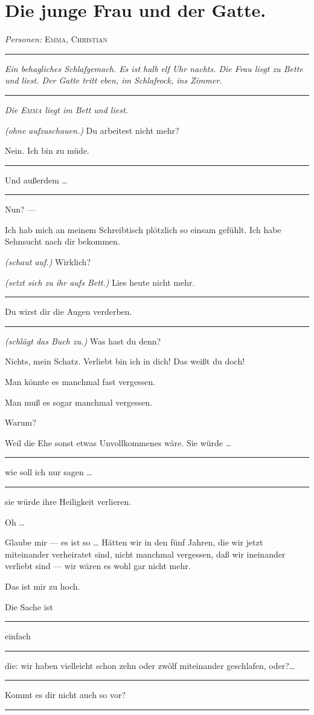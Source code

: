 \documentclass[
	final,
	a4paper,
	ngerman,
	mpinclude = true, %
	twoside = true,
	open = right,
	cleardoublepage = plain,
	DIV = 13,
	BCOR = 1cm,
	titlepage = firstiscover,
	]{scrbook}
\newcommand{\scene}{\section}
\newcommand{\direction}[1]{\textit{(#1)}}
\newcommand{\setting}[1]{\vspace{-0.5\baselineskip}\centering\textit{#1}}
\newenvironment{deletion}{%
		\vspace{0.25\baselineskip}
		\hrule
		\vspace{0.25\baselineskip}
		\color{darkgray}
	}{
		\color{black}
		\vspace{0.25\baselineskip}
		\hrule 
		\vspace{0.25\baselineskip}
	}
\newcommand{\characterlist}[1]{{\begin{center}\textit{Personen:} #1\end{center}}}
\newcommand{\thecharacter}[1]{\textup{\textsc{#1}}\xspace}
\newcommand{\thefrau}{\thecharacter{Emma}}
\newcommand{\thegatte}{\thecharacter{Christian}}
\newcommand{\character}[1]{\item[#1:]}
\newcommand{\frau}{\character{\thefrau}}
\newcommand{\gatte}{\character{\thegatte}}
\begin{document}
\scene{Die junge Frau und der Gatte.}
\characterlist{\thefrau, \thegatte}
\begin{deletion}
\setting{Ein behagliches Schlafgemach. Es ist halb elf Uhr nachts. Die Frau liegt zu Bette und liest. Der Gatte tritt eben, im Schlafrock, ins Zimmer.}
\end{deletion}
\setting{Die \thefrau liegt im Bett und liest.}

\begin{play}

	\frau
	\direction{ohne aufzuschauen.} Du arbeitest nicht mehr?

	\gatte
	Nein. Ich bin zu müde.
	\begin{deletion}
	Und außerdem \ldots{}
	\end{deletion}

	\frau
	Nun? ---

	\gatte
	Ich hab mich an meinem Schreibtisch plötzlich so einsam gefühlt. Ich habe Sehnsucht nach dir bekommen.

	\frau
	\direction{schaut auf.} Wirklich?

	\gatte
	\direction{setzt sich zu ihr aufs Bett.} Lies heute nicht mehr.
	\begin{deletion}
	Du wirst dir die Augen verderben.
	\end{deletion}

	\frau
	\direction{schlägt das Buch zu.} Was hast du denn?

	\gatte
	Nichts, mein Schatz. Verliebt bin ich in dich! Das weißt du doch!

	\frau
	Man könnte es manchmal fast vergessen.

	\gatte
	Man muß es sogar manchmal vergessen.

	\frau
	Warum?

	\gatte
	Weil die Ehe sonst etwas Unvollkommenes wäre. Sie würde \ldots{}
	\begin{deletion}
		wie soll ich nur sagen \ldots{}
	\end{deletion}
	sie würde ihre Heiligkeit verlieren.

	\frau
	Oh \ldots{}

	\gatte
	Glaube mir --- es ist so \ldots{} Hätten wir in den fünf Jahren, die wir jetzt miteinander verheiratet sind, nicht manchmal vergessen, daß wir ineinander verliebt sind --- wir wären es wohl gar nicht mehr.

	\frau
	Das ist mir zu hoch.

	\gatte
	Die Sache ist
	\begin{deletion}
		einfach
	\end{deletion}
	die: wir haben vielleicht schon zehn oder zwölf miteinander geschlafen, oder?\ldots{}
	\begin{deletion}
		Kommt es dir nicht auch so vor?
	\end{deletion}


\end{play}
\end{document}

